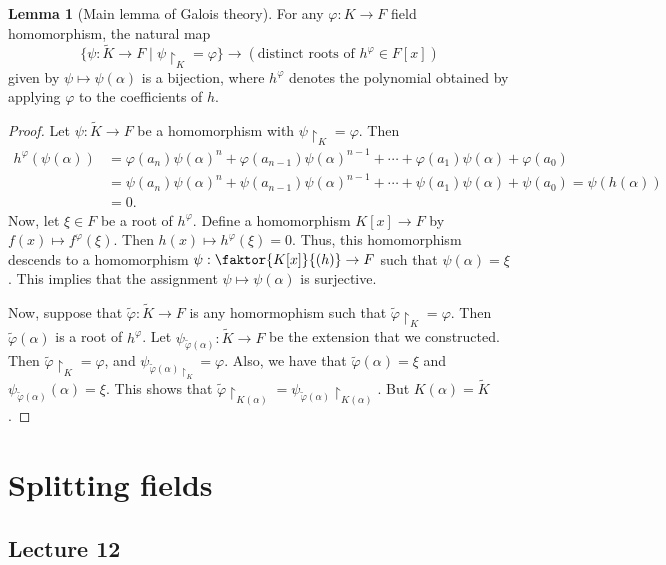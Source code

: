 \documentclass[10pt,letterpaper,cm]{nupset}
\theoremstyle{definition}
\theoremstyle{theorem}
\newtheorem{lemma}[definition]{Lemma}
\theoremstyle{remark}
\newcommand{\1}{\mathbf{1}}
\newcommand{\0}{\vec 0}
\begin{document}
\begin{lemma}[Main lemma of Galois theory]
For any $\varphi : K \to F$ field homomorphism, the natural map $$\{\psi : \widetilde{K} \to F \mid \psi \restriction_K = \varphi \} \to (\text{distinct roots of } h^{\varphi} \in F[x])$$ given by $ \psi \mapsto \psi(\alpha)$ is a bijection, where $h^{\varphi}$ denotes the polynomial obtained by applying $\varphi$ to the coefficients of $h$. 
\end{lemma}
\begin{proof}
Let $\psi : \widetilde{K} \to F$ be a homomorphism with $\psi \restriction_K = \varphi$. Then 
\begin{align*}
h^{\varphi}(\psi(\alpha)) & = \varphi(a_n)\psi(\alpha)^n + \varphi(a_{n-1})\psi(\alpha)^{n-1} + \cdots + \varphi(a_1) \psi(\alpha) + \varphi(a_0) 
\\ & = \psi(a_n)\psi(\alpha)^n + \psi(a_{n-1})\psi(\alpha)^{n-1} + \cdots + \psi(a_1)\psi(\alpha) + \psi(a_0) = \psi(h(\alpha)) 
\\ &= 0.
\end{align*}  Now, let $\xi \in F$ be a root of $h^{\varphi}$. Define a homomorphism $K[x] \to F$ by $f(x) \mapsto f^{\varphi}(\xi)$. Then $h(x) \mapsto h^{\varphi}(\xi)=0$. Thus, this homomorphism descends to a homomorphism $\psi : \faktor{K[x]}{(h)} \to F$ such that $\psi(\alpha) = \xi$. This implies that the assignment $\psi \mapsto \psi(\alpha)$ is surjective.

\medskip


Now, suppose that $\tilde{\varphi} : \widetilde{K} \to F$ is any homormophism such that $\tilde{\varphi}\restriction_K = \varphi$. Then $\tilde{\varphi}(\alpha)$ is a root of $h^{\varphi}$. Let $\psi_{\tilde{\varphi}(\alpha)} : \widetilde{K} \to F$ be the extension that we constructed. Then $\tilde{\varphi}\restriction_K = \varphi$, and $\psi_{\tilde{\varphi}(\alpha)\restriction_K} = \varphi$. Also, we have that $\tilde{\varphi}(\alpha) = \xi$ and $\psi_{\tilde{\varphi}(\alpha)}(\alpha) = \xi$. This shows that $\tilde{\varphi}\restriction_{K(\alpha)} = \psi_{\tilde{\varphi}(\alpha)} \restriction_{K(\alpha)}$. But $K(\alpha) = \widetilde{K}$.
\end{proof}

\section{Splitting fields}

\subsection{Lecture 12}
\end{document}
